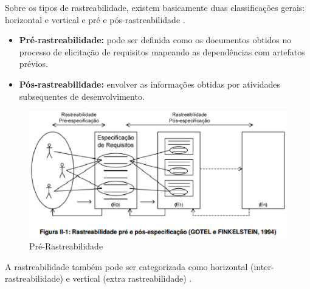 Sobre os tipos de rastreabilidade, existem basicamente duas classificações gerais: horizontal e vertical e pré e
pós-rastreabilidade \cite{finkelstein1995}.



\begin{itemize}
	\item \textbf{Pré-rastreabilidade:} pode ser  definida como os documentos obtidos no processo de elicitação de requisitos mapeando as dependências com artefatos prévios.
	\item \textbf{Pós-rastreabilidade:} envolver as informações obtidas por atividades subsequentes de desenvolvimento.
\end{itemize}
\newpage
\begin{figure}[h]
	\centering
	\includegraphics[keepaspectratio=true,scale=0.9]{figuras/rastreabilidade_ida_e_volta.eps}
	\caption{Pré-Rastreabilidade}
	\label{fig05}
\end{figure}

A rastreabilidade também pode ser categorizada como horizontal (inter-rastreabilidade) e vertical (extra rastreabilidade)
 \cite{sommerville1998}.


